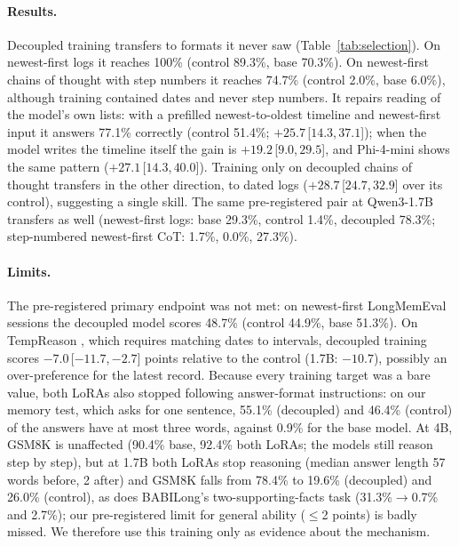 \documentclass[11pt]{article}
\newcommand{\ci}[2]{\,[$#1$,\,$#2$]}
\begin{document}
\paragraph{Results.}
Decoupled training transfers to formats it never saw (Table~\ref{tab:selection}).
On newest-first logs it reaches 100\% (control 89.3\%, base 70.3\%).
On newest-first chains of thought with step numbers it reaches 74.7\% (control 2.0\%, base 6.0\%), although training contained dates and never step numbers.
It repairs reading of the model's own lists: with a prefilled newest-to-oldest timeline and newest-first input it answers 77.1\% correctly (control 51.4\%; $+25.7$\ci{14.3}{37.1}); when the model writes the timeline itself the gain is $+19.2$\ci{9.0}{29.5}, and Phi-4-mini shows the same pattern ($+27.1$\ci{14.3}{40.0}).
Training only on decoupled chains of thought transfers in the other direction, to dated logs ($+28.7$\ci{24.7}{32.9} over its control), suggesting a single skill.
The same pre-registered pair at Qwen3-1.7B transfers as well (newest-first logs: base 29.3\%, control 1.4\%, decoupled 78.3\%; step-numbered newest-first CoT: 1.7\%, 0.0\%, 27.3\%).

\paragraph{Limits.}
The pre-registered primary endpoint was not met: on newest-first LongMemEval sessions the decoupled model scores 48.7\% (control 44.9\%, base 51.3\%). On TempReason \citep{tan2023tempreason}, which requires matching dates to intervals, decoupled training scores $-7.0$\ci{-11.7}{-2.7} points relative to the control (1.7B: $-10.7$), possibly an over-preference for the latest record.
Because every training target was a bare value, both LoRAs also stopped following answer-format instructions: on our memory test, which asks for one sentence, 55.1\% (decoupled) and 46.4\% (control) of the answers have at most three words, against 0.9\% for the base model. At 4B, GSM8K \citep{cobbe2021gsm8k} is unaffected (90.4\% base, 92.4\% both LoRAs; the models still reason step by step), but at 1.7B both LoRAs stop reasoning (median answer length 57 words before, 2 after) and GSM8K falls from 78.4\% to 19.6\% (decoupled) and 26.0\% (control), as does BABILong's two-supporting-facts task \citep{kuratov2024babilong} (31.3\%$\rightarrow$0.7\% and 2.7\%); our pre-registered limit for general ability ($\leq$2 points) is badly missed. We therefore use this training only as evidence about the mechanism.
\end{document}
